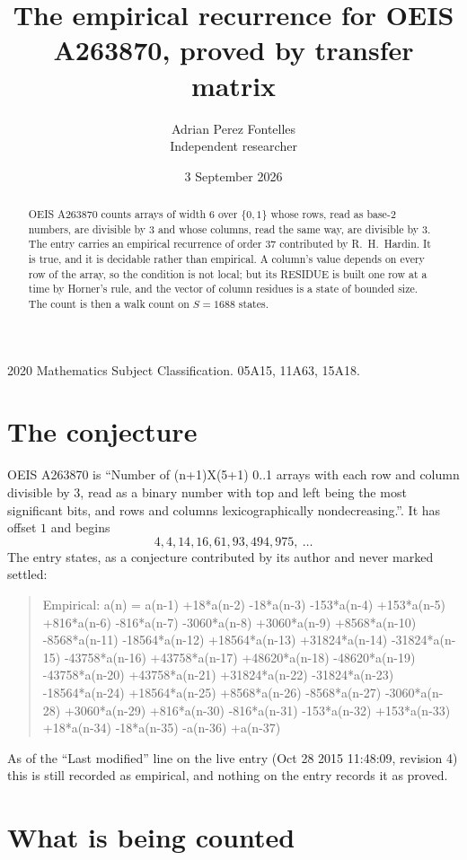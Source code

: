 \documentclass[11pt,a4paper]{article}
\title{The empirical recurrence for OEIS A263870, proved by transfer matrix}
\author{Adrian Perez Fontelles\\ \small Independent researcher}
\date{3 September 2026}
\theoremstyle{plain}
\theoremstyle{definition}
\begin{document}
\maketitle

\begin{abstract}
OEIS A263870 counts arrays of width $6$ over $\{0,1\}$ whose rows, read as base-$2$
numbers, are divisible by $3$ and whose columns, read the same way, are divisible by
$3$. The entry carries an empirical recurrence of order $37$ contributed by
R.~H.~Hardin. It is true, and it is decidable rather than empirical. A column's value depends on
every row of the array, so the condition is not local; but its RESIDUE is built one row at a
time by Horner's rule, and the vector of column residues is a state of bounded size. The count
is then a walk count on $S=1688$ states.
\end{abstract}

\noindent\small 2020 Mathematics Subject Classification. 05A15, 11A63, 15A18.\normalsize

\section{The conjecture}

OEIS A263870 is ``Number of (n+1)X(5+1) 0..1 arrays with each row and column divisible by 3, read as a binary number with top and left being the most significant bits, and rows and columns lexicographically nondecreasing.''. It has offset $1$ and begins
\[
4, 4, 14, 16, 61, 93, 494, 975,\ \dots
\]
The entry states, as a conjecture contributed by its author and never marked settled:
\begin{quote}
Empirical: a(n) = a(n-1) +18*a(n-2) -18*a(n-3) -153*a(n-4) +153*a(n-5) +816*a(n-6) -816*a(n-7) -3060*a(n-8) +3060*a(n-9) +8568*a(n-10) -8568*a(n-11) -18564*a(n-12) +18564*a(n-13) +31824*a(n-14) -31824*a(n-15) -43758*a(n-16) +43758*a(n-17) +48620*a(n-18) -48620*a(n-19) -43758*a(n-20) +43758*a(n-21) +31824*a(n-22) -31824*a(n-23) -18564*a(n-24) +18564*a(n-25) +8568*a(n-26) -8568*a(n-27) -3060*a(n-28) +3060*a(n-29) +816*a(n-30) -816*a(n-31) -153*a(n-32) +153*a(n-33) +18*a(n-34) -18*a(n-35) -a(n-36) +a(n-37)
\end{quote}
As of the ``Last modified'' line on the live entry (Oct 28 2015 11:48:09, revision 4) this is still
recorded as empirical, and nothing on the entry records it as proved.

\section{What is being counted}
\end{document}
